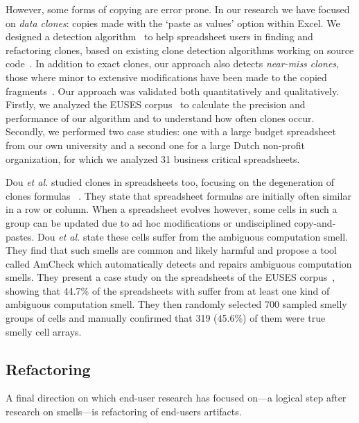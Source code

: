 \documentclass[conference]{IEEEtran}
\begin{document}
However, some forms of copying are error prone. In our research we have focused on \emph{data clones}: copies made with the `paste as values' option within Excel. We designed a detection algorithm~\cite{hermans_data_2013} to help spreadsheet users in finding and refactoring clones, based on existing clone detection algorithms working on source code~\cite{DBLP:conf/cascon/Johnson93}. In addition to exact clones, our approach also detects \emph{near-miss clones}, those where minor to extensive modifications have been made to the copied fragments~\cite{DBLP:conf/icsm/Roy09}. Our approach was  validated both quantitatively and qualitatively. Firstly, we analyzed the EUSES corpus~\cite{fisher_euses_2005} to calculate the precision and performance of our algorithm and to understand how often clones occur. Secondly, we performed two case studies: one with a large budget spreadsheet from our own university and a second one for a large Dutch non-profit organization, for which we analyzed 31 business critical spreadsheets.

Dou \emph{et al.} studied clones in spreadsheets too, focusing on the degeneration of clones formulas ~\cite{dou_is_2014}. They state that spreadsheet formulas are initially often similar in a row or column. When a spreadsheet evolves however, some cells in such a group can be updated due to ad hoc modifications or undisciplined copy-and-pastes. Dou \emph{et al.} state these cells suffer from the ambiguous computation smell. They find that such smells are common and likely harmful and propose a tool called AmCheck which automatically detects and repairs ambiguous computation smells. They present a case study on the spreadsheets of the EUSES corpus~\cite{fisher_euses_2005}, showing that 44.7\% of the spreadsheets with suffer from at  least  one  kind  of ambiguous computation smell. They then randomly selected 700 sampled smelly groups of cells and manually confirmed that 319 (45.6\%) of them were true smelly cell arrays. 

\subsection{Refactoring}
A final direction on which end-user research has focused on---a logical step after research on smells---is refactoring of end-users artifacts. 

\end{document}

